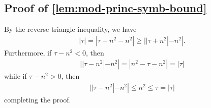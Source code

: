 \documentclass[12pt,reqno]{amsart}
\numberwithin{equation}{section}  %
\numberwithin{figure}{section}
\theoremstyle{plain}
\theoremstyle{definition}
\theoremstyle{remark}
\begin{document}
\subsection{Proof of \autoref{lem:mod-princ-symb-bound}} 
\label{ssec:pf-mod-princ}
By the reverse triangle inequality, we have
%
%
\begin{equation*}
\begin{split}
  | \tau | = | \tau + n^{2} - n^{2} | \ge | | \tau + n^{2} | - n^{2} |.
\end{split}
\end{equation*}
%
%
Furthermore, if $\tau - n^{2} < 0$, then
%
%
\begin{equation*}
\begin{split}
  | | \tau - n^{2} | - n^{2} | = | n^{2} - \tau - n^{2} | = | \tau |
\end{split}
\end{equation*}
%
%
while if $\tau - n^{2} > 0$, then
%
%
\begin{equation*}
\begin{split}
  | | \tau - n^{2} | - n^{2} | \le n^{2} \le \tau = |\tau|
\end{split}
\end{equation*}
%
%
completing the proof. \qquad \qedsymbol
%
%
\end{document}
